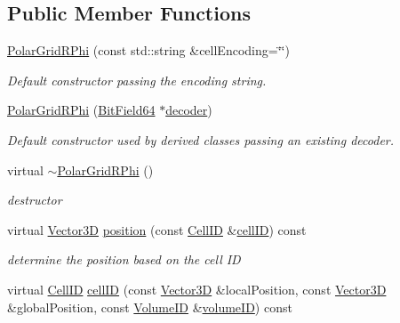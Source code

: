 \subsection*{Public Member Functions}
\begin{DoxyCompactItemize}
\item 
\hyperlink{class_d_d4hep_1_1_d_d_segmentation_1_1_polar_grid_r_phi_a1894c699445be28e281dc8e292c70efb}{Polar\+Grid\+R\+Phi} (const std\+::string \&cell\+Encoding=\char`\"{}\char`\"{})
\begin{DoxyCompactList}\small\item\em Default constructor passing the encoding string. \end{DoxyCompactList}\item 
\hyperlink{class_d_d4hep_1_1_d_d_segmentation_1_1_polar_grid_r_phi_aca178a8d2d6a77ea6e33dddb479bbbd9}{Polar\+Grid\+R\+Phi} (\hyperlink{class_d_d4hep_1_1_d_d_segmentation_1_1_bit_field64}{Bit\+Field64} $\ast$\hyperlink{class_d_d4hep_1_1_d_d_segmentation_1_1_segmentation_abec3489982d0fe91ef4b142d9d755576}{decoder})
\begin{DoxyCompactList}\small\item\em Default constructor used by derived classes passing an existing decoder. \end{DoxyCompactList}\item 
virtual \hyperlink{class_d_d4hep_1_1_d_d_segmentation_1_1_polar_grid_r_phi_a6801dd3c1227633c1865d9f4acf3b7cb}{$\sim$\+Polar\+Grid\+R\+Phi} ()
\begin{DoxyCompactList}\small\item\em destructor \end{DoxyCompactList}\item 
virtual \hyperlink{struct_d_d4hep_1_1_d_d_segmentation_1_1_vector3_d}{Vector3D} \hyperlink{class_d_d4hep_1_1_d_d_segmentation_1_1_polar_grid_r_phi_af010e7834967170f9f7ea5101b8da1a7}{position} (const \hyperlink{namespace_d_d4hep_1_1_d_d_segmentation_ac7af071d85cb48820914434a07e21ba1}{Cell\+ID} \&\hyperlink{class_d_d4hep_1_1_d_d_segmentation_1_1_polar_grid_r_phi_a09c10a43f4364403515057ffb5a56f4e}{cell\+ID}) const
\begin{DoxyCompactList}\small\item\em determine the position based on the cell ID \end{DoxyCompactList}\item 
virtual \hyperlink{namespace_d_d4hep_1_1_d_d_segmentation_ac7af071d85cb48820914434a07e21ba1}{Cell\+ID} \hyperlink{class_d_d4hep_1_1_d_d_segmentation_1_1_polar_grid_r_phi_a09c10a43f4364403515057ffb5a56f4e}{cell\+ID} (const \hyperlink{struct_d_d4hep_1_1_d_d_segmentation_1_1_vector3_d}{Vector3D} \&local\+Position, const \hyperlink{struct_d_d4hep_1_1_d_d_segmentation_1_1_vector3_d}{Vector3D} \&global\+Position, const \hyperlink{namespace_d_d4hep_1_1_d_d_segmentation_a61a6833a18d1800bdef176595f83e3ba}{Volume\+ID} \&\hyperlink{class_d_d4hep_1_1_d_d_segmentation_1_1_segmentation_a43c0e9648e3b7cded015847c0802f757}{volume\+ID}) const

\end{DoxyCompactItemize}
